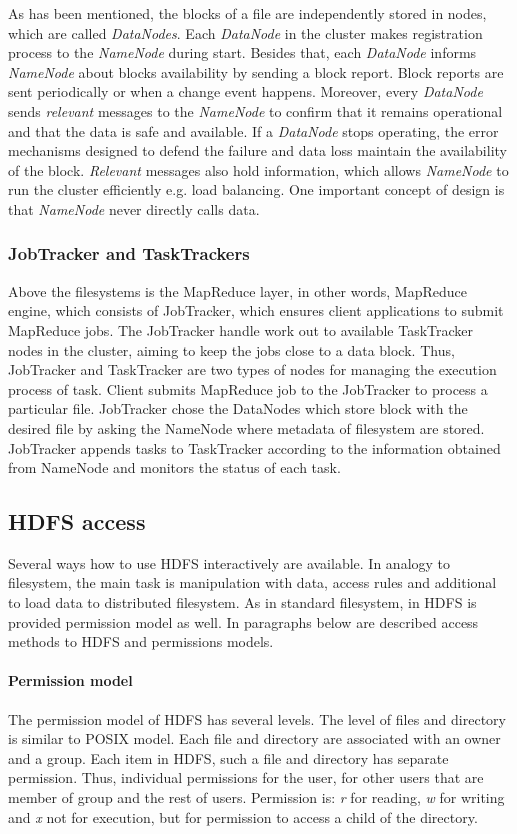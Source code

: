 \documentclass[a4paper,12pt,oneside]{report}
\begin{document}
	As has been mentioned, the blocks of a file are independently stored in nodes,
	which are called
	\textit{DataNodes}. Each \textit{DataNode} in the cluster makes registration
	process to the \textit{NameNode} during start. 
	Besides that, each \textit{DataNode} informs \textit{NameNode} about blocks
	availability by sending a block report. 
	Block reports are sent periodically or when a change event happens. Moreover,
	every \textit{DataNode} sends 
	\emph{relevant} messages to the \textit{NameNode} to confirm that
	it remains operational and that the data is safe and available. If a
	\textit{DataNode} stops operating, the error 
	mechanisms designed to defend the failure and data loss maintain the
	availability of the block.
	\emph{Relevant} messages also hold information, which allows \textit{NameNode}
	to run the cluster efficiently e.g. 
	load balancing. One important concept of design  is that \textit{NameNode} never
	directly calls data.
	
	
	\subsubsection{JobTracker and TaskTrackers}
	Above the filesystems is  the MapReduce layer, in other words, MapReduce engine,
	which consists of 
	JobTracker,  which ensures client applications to submit MapReduce jobs. The
	JobTracker handle work 
	out to available TaskTracker nodes in the cluster, 
	aiming to keep the jobs close to a data block.  Thus, JobTracker and TaskTracker
	are two types of 
	nodes for managing the execution process of  task.
	Client submits MapReduce job  to the JobTracker to process a particular file.
	JobTracker chose the 
	DataNodes which store block with the desired file by asking the NameNode where 
	metadata of filesystem are stored. 
	JobTracker appends tasks to TaskTracker according to the  information obtained
	from NameNode and monitors the status of each task.
	
	
	\subsection{HDFS access} 
	Several ways how to use HDFS interactively are available. In analogy to
	filesystem, the main task is manipulation with data, access rules and additional
	to load data to distributed filesystem. As in standard filesystem, in HDFS is
	provided permission model as well. In paragraphs below are described access
	methods to HDFS and permissions models.
	
	\paragraph{Permission model}
	The permission model of HDFS has several levels. The level of files and
	directory is similar to POSIX model. Each file and directory are associated with
	an owner and a group. Each item in HDFS, such a file and directory has separate
	permission. Thus, individual permissions for the user, for other users that are
	member of group and the rest of users. Permission is: \textit{r} for reading,
	\textit{w} for writing and \textit{x} not for execution, but for permission to
	access a child of the directory.\cite{permission}
	
\end{document}
